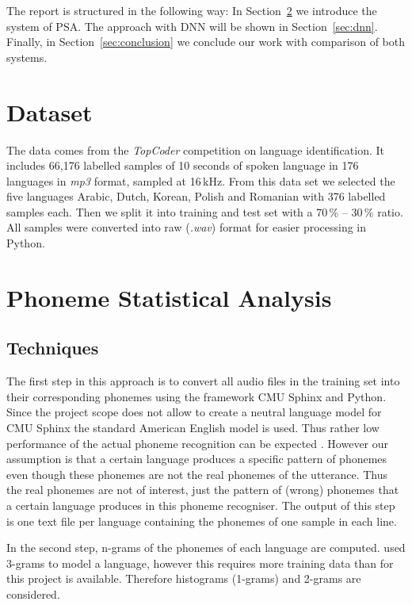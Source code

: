 \documentclass{article}
\begin{document}
The report is structured in the following way: In Section~\ref{sec:psa} we introduce the system of PSA. The approach with DNN will be shown in Section~\ref{sec:dnn}. Finally, in Section~\ref{sec:conclusion} we conclude our work with comparison of both systems. 

\section{Dataset}
\label{sec:dataset}
The data comes from the \textit{TopCoder} competition on language identification. It includes 66,176 labelled samples of 10 seconds of spoken language in 176 languages in \textit{mp3} format, sampled at 16\,kHz. From this data set we selected the five languages Arabic,  Dutch,  Korean,  Polish  and  Romanian with 376 labelled samples each. Then we split it into training and test set with a 70\,\% -- 30\,\% ratio. All samples were converted into raw (\textit{.wav}) format for easier processing in Python.

\section{Phoneme Statistical Analysis}
\label{sec:psa}
\subsection{Techniques}
The first step in this approach is to convert all audio files in the training set into their corresponding phonemes using the framework CMU Sphinx \cite{lamere2003cmu} and Python. Since the project scope does not allow to create a neutral language model for CMU Sphinx the standard American English model is used. Thus rather low performance of the actual phoneme recognition can be expected \cite{kepuska2017comparing}. However our assumption is that a certain language produces a specific pattern of phonemes even though these phonemes are not the real phonemes of the utterance. Thus the real phonemes are not of interest, just the pattern of (wrong) phonemes that a certain language produces in this phoneme recogniser. The output of this step is one text file per language containing the phonemes of one sample in each line.

In the second step, n-grams of the phonemes of each language are computed. \cite{matejka2005phonotactic} used 3-grams to model a language, however this requires more training data than for this project is available. Therefore histograms (1-grams) and 2-grams are considered.
\end{document}
